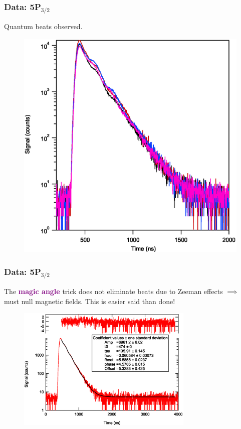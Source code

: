 \documentclass{beamer}
\theoremstyle{definition}
\begin{document}
\begin{frame}
\frametitle{Data: 5P$_{\text{3/2}}$}

Quantum beats observed. 


\begin{figure}[!htb]
	\centering
	\includegraphics[height=0.75\textheight]{big_beats.eps}
\end{figure}


\end{frame}





\begin{frame}
\frametitle{Data: 5P$_{\text{3/2}}$}

The \textcolor{purple}{\textbf{magic angle}} trick does not eliminate beats due to Zeeman effects $\implies$ must null magnetic fields. This is easier said than done!

\begin{figure}[!htb]
	\centering
	\includegraphics[width=0.75\textwidth]{small_beats_1.eps}
\end{figure}


\end{frame}
\end{document}
